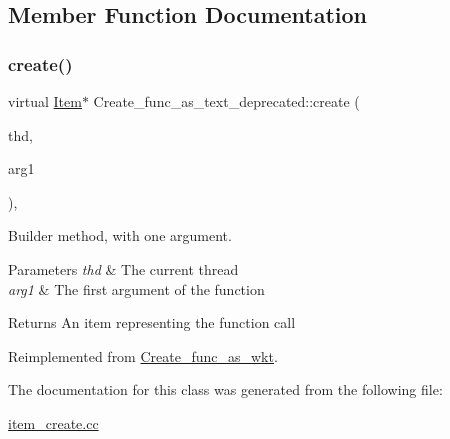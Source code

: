 \subsection{Member Function Documentation}
\mbox{\label{classCreate__func__as__text__deprecated_a70b5c2ffaf2afdf07c1229039a546697}} 
\subsubsection{\texorpdfstring{create()}{create()}}
{\footnotesize\ttfamily virtual \mbox{\hyperlink{classItem}{Item}}$\ast$ Create\+\_\+func\+\_\+as\+\_\+text\+\_\+deprecated\+::create (\begin{DoxyParamCaption}\item[{T\+HD $\ast$}]{thd,  }\item[{\mbox{\hyperlink{classItem}{Item}} $\ast$}]{arg1 }\end{DoxyParamCaption})\hspace{0.3cm}{\ttfamily [inline]}, {\ttfamily [virtual]}}

Builder method, with one argument. 
\begin{DoxyParams}{Parameters}
{\em thd} & The current thread \\
\hline
{\em arg1} & The first argument of the function \\
\hline
\end{DoxyParams}
\begin{DoxyReturn}{Returns}
An item representing the function call 
\end{DoxyReturn}


Reimplemented from \mbox{\hyperlink{classCreate__func__as__wkt_ab99b74b6521f9894ce13159797180093}{Create\+\_\+func\+\_\+as\+\_\+wkt}}.



The documentation for this class was generated from the following file\+:\begin{DoxyCompactItemize}
\item 
\mbox{\hyperlink{item__create_8cc}{item\+\_\+create.\+cc}}\end{DoxyCompactItemize}

